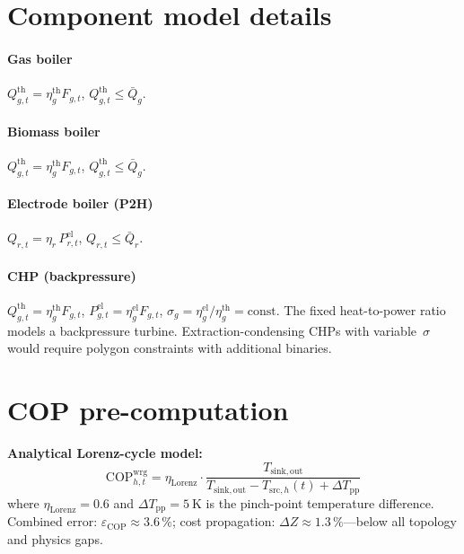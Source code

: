 \documentclass[review,3p]{elsarticle}
\begin{document}
\section{Component model details}
\label{app:component_models}

\paragraph{Gas boiler}
$Q_{g,t}^{\mathrm{th}} = \eta_g^{\mathrm{th}} F_{g,t}$,\quad
$Q_{g,t}^{\mathrm{th}} \leq \bar{Q}_g$.

\paragraph{Biomass boiler}
$Q_{g,t}^{\mathrm{th}} = \eta_g^{\mathrm{th}} F_{g,t}$,\quad
$Q_{g,t}^{\mathrm{th}} \leq \bar{Q}_g$.

\paragraph{Electrode boiler (P2H)}
$Q_{r,t} = \eta_r\, P_{r,t}^{\mathrm{el}}$,\quad
$Q_{r,t} \leq \bar{Q}_r$.

\paragraph{CHP (backpressure)}
$Q_{g,t}^{\mathrm{th}} = \eta_g^{\mathrm{th}} F_{g,t}$,\quad
$P_{g,t}^{\mathrm{el}} = \eta_g^{\mathrm{el}} F_{g,t}$,\quad
$\sigma_g = \eta_g^{\mathrm{el}} / \eta_g^{\mathrm{th}} =
\mathrm{const}$.
The fixed heat-to-power ratio models a backpressure turbine.
Extraction-condensing CHPs with variable~$\sigma$ would require
polygon constraints with additional binaries.

\section{COP pre-computation}
\label{app:cop}

\textbf{Analytical Lorenz-cycle model:}
\begin{equation}
  \mathrm{COP}_{h,t}^{\mathrm{wrg}} = \eta_{\mathrm{Lorenz}}
    \cdot \frac{T_{\mathrm{sink,out}}}{
      T_{\mathrm{sink,out}} - T_{\mathrm{src},h}(t)
      + \Delta T_{\mathrm{pp}}}
\end{equation}
where $\eta_{\mathrm{Lorenz}} = 0.6$ and
$\Delta T_{\mathrm{pp}} = \SI{5}{\kelvin}$ is the pinch-point
temperature difference. Combined error:
$\varepsilon_{\mathrm{COP}} \approx 3.6\,\%$; cost propagation:
$\Delta Z \approx 1.3\,\%$---below all topology and physics gaps.
\end{document}

